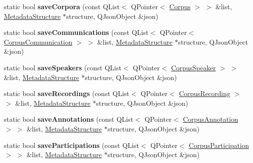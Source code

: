 \begin{DoxyCompactItemize}
\item 
\mbox{\label{class_j_s_o_n_serialiser_metadata_a471260ffca701dbc1ceb670a5e7fa2cc}} 
static bool {\bfseries save\+Corpora} (const Q\+List$<$ Q\+Pointer$<$ \hyperlink{class_corpus}{Corpus} $>$ $>$ \&list, \hyperlink{class_metadata_structure}{Metadata\+Structure} $\ast$structure, Q\+Json\+Object \&json)
\item 
\mbox{\label{class_j_s_o_n_serialiser_metadata_a1fd922f6e1e7815f48e476729e668f20}} 
static bool {\bfseries save\+Communications} (const Q\+List$<$ Q\+Pointer$<$ \hyperlink{class_corpus_communication}{Corpus\+Communication} $>$ $>$ \&list, \hyperlink{class_metadata_structure}{Metadata\+Structure} $\ast$structure, Q\+Json\+Object \&json)
\item 
\mbox{\label{class_j_s_o_n_serialiser_metadata_a826e9bd41ca643d028dd32d7698ae36b}} 
static bool {\bfseries save\+Speakers} (const Q\+List$<$ Q\+Pointer$<$ \hyperlink{class_corpus_speaker}{Corpus\+Speaker} $>$ $>$ \&list, \hyperlink{class_metadata_structure}{Metadata\+Structure} $\ast$structure, Q\+Json\+Object \&json)
\item 
\mbox{\label{class_j_s_o_n_serialiser_metadata_a97e55280ae416a13451e8a7731fcb698}} 
static bool {\bfseries save\+Recordings} (const Q\+List$<$ Q\+Pointer$<$ \hyperlink{class_corpus_recording}{Corpus\+Recording} $>$ $>$ \&list, \hyperlink{class_metadata_structure}{Metadata\+Structure} $\ast$structure, Q\+Json\+Object \&json)
\item 
\mbox{\label{class_j_s_o_n_serialiser_metadata_ad938d1914dc9f47316808eb03020ac3d}} 
static bool {\bfseries save\+Annotations} (const Q\+List$<$ Q\+Pointer$<$ \hyperlink{class_corpus_annotation}{Corpus\+Annotation} $>$ $>$ \&list, \hyperlink{class_metadata_structure}{Metadata\+Structure} $\ast$structure, Q\+Json\+Object \&json)
\item 
\mbox{\label{class_j_s_o_n_serialiser_metadata_a5f89ac1d96dbdde9d45cf79cb5c07dab}} 
static bool {\bfseries save\+Participations} (const Q\+List$<$ Q\+Pointer$<$ \hyperlink{class_corpus_participation}{Corpus\+Participation} $>$ $>$ \&list, \hyperlink{class_metadata_structure}{Metadata\+Structure} $\ast$structure, Q\+Json\+Object \&json)

\end{DoxyCompactItemize}
